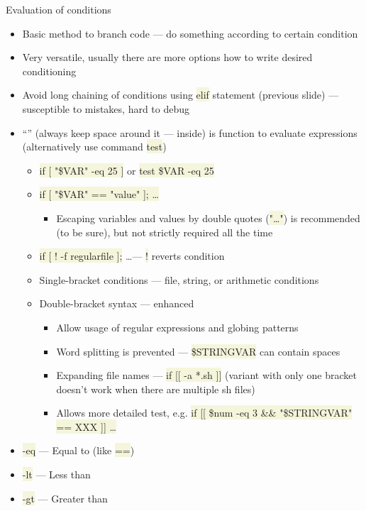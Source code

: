 \documentclass[compress, ucs, xelatex, 11pt, xcolor=svgnames, aspectratio=169,
	hyperref={
		bookmarks=true,
		unicode=true,
		colorlinks=true,
		pdftitle={Linux, command line and MetaCentrum},
		plainpages=false,
		pdfauthor={Vojtech Zeisek},
		pdfsubject={Course about use of Linux command line, writing shell scripts and using MetaCentrum of CESNET},
		pdfcreator={XeLaTeX},
		pdfkeywords={Linux, GNU, BASH, shell, command line, MetaCentrum},
		linkcolor=DarkRed, %
		anchorcolor=DarkBlue, %
		citecolor=Indigo, %
		filecolor=NavyBlue, %
		menucolor=DarkMagenta, %
		urlcolor=DarkBlue, %
		pdftex},
	url={hyphens, lowtilde} %
	]{beamer}
\renewcommand{\texttt}[1]{\colorbox{Beige}{{\ttfamily #1}}}
\begin{document}
\begin{frame}[allowframebreaks]{Evaluation of conditions}
	\begin{itemize}
		\item Basic method to branch code --- do something according to certain condition
		\item Very versatile, usually there are more options how to write desired conditioning
		\item Avoid long chaining of conditions using \texttt{elif} statement (previous slide) --- susceptible to mistakes, hard to debug
		\item \enquote{\texttt{[~\ldots~]}} (always keep space around it --- inside) is function to evaluate expressions (alternatively use command \texttt{test})
		\begin{itemize}
			\item \texttt{if [ "\$VAR" -eq 25 ]} or \texttt{test \$VAR -eq 25}
			\item \texttt{if [ "\$VAR" == "value" ]; \ldots}
			\begin{itemize}
				\item Escaping variables and values by double quotes (\texttt{"\ldots"}) is recommended (to be sure), but not strictly required all the time
			\end{itemize}
			\item \texttt{if [ ! -f regularfile ];} \ldots --- \texttt{!} reverts condition
			\item Single-bracket conditions --- file, string, or arithmetic conditions
			\item Double-bracket syntax --- enhanced
			\begin{itemize}
				\item Allow usage of regular expressions and globing patterns
				\item Word splitting is prevented --- \texttt{\$STRINGVAR} can contain spaces
				\item Expanding file names --- \texttt{if [[ -a *.sh ]]} (variant with only one bracket doesn't work when there are multiple sh files)
				\item Allows more detailed test, e.g. \texttt{if [[ \$num -eq 3 \&\& "\$STRINGVAR" == XXX ]] \ldots}
			\end{itemize}
		\end{itemize}
		\item \texttt{-eq} --- Equal to (like \texttt{==})
		\item \texttt{-lt} --- Less than
		\item \texttt{-gt} --- Greater than

\end{itemize}
\end{frame}
\end{document}
